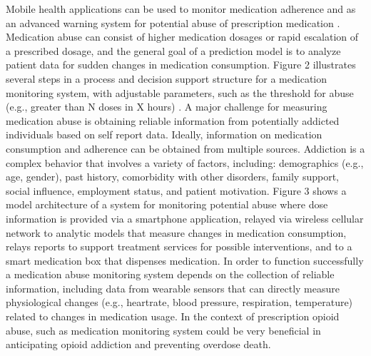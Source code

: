 \documentclass[sigconf]{acmart}
\begin{document}
Mobile health applications can be used to monitor medication adherence and 
as an advanced warning system for potential abuse of prescription medication 
\cite{varshney13}. Medication abuse can consist of higher medication dosages 
or rapid escalation of a prescribed dosage, and the general goal of a prediction 
model is to analyze patient data for sudden changes in medication consumption. 
Figure 2 illustrates several steps in a process and decision support structure 
for a medication monitoring system, with adjustable parameters, such as the 
threshold for abuse (e.g., greater than N doses in X hours) \cite{Varshney14}. 
A major challenge for measuring medication abuse is obtaining reliable 
information from potentially addicted individuals based on self report data. 
Ideally, information on medication consumption and adherence can be obtained 
from multiple sources. Addiction is a complex behavior that involves a variety 
of factors, including: demographics (e.g., age, gender), past history, 
comorbidity with other disorders, family support, social influence, employment 
status, and patient motivation. Figure 3 shows a model architecture of a system 
for monitoring potential abuse where dose information is provided via a 
smartphone application, relayed via wireless cellular network to analytic models 
that measure changes in medication consumption, relays reports to support 
treatment services for possible interventions, and to a smart medication box that 
dispenses medication. In order to function successfully a medication abuse 
monitoring system depends on the collection of reliable information, including 
data from wearable sensors that can directly measure physiological changes 
(e.g., heartrate, blood pressure, respiration, temperature) related to changes 
in medication usage. In the context of prescription opioid abuse, such as 
medication monitoring system could be very beneficial in anticipating opioid 
addiction and preventing overdose death. 
\end{document}
